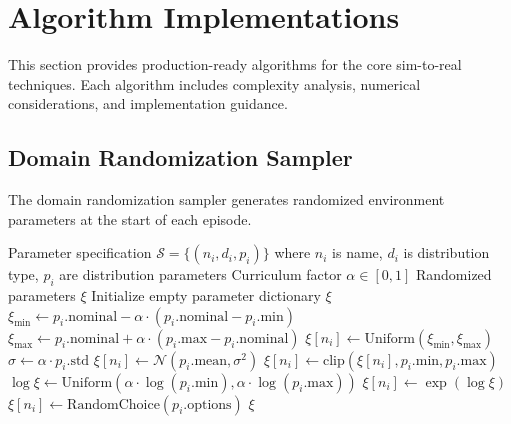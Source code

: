 \section{Algorithm Implementations}
\label{sec:algorithm_implementations_sim2real}

This section provides production-ready algorithms for the core sim-to-real techniques. Each algorithm includes complexity analysis, numerical considerations, and implementation guidance.

\subsection{Domain Randomization Sampler}

The domain randomization sampler generates randomized environment parameters at the start of each episode.

\begin{algorithm}[H]
\caption{Domain Randomization Parameter Sampler}
\label{alg:domain_randomization}
\begin{algorithmic}[1]
\REQUIRE Parameter specification $\mathcal{S} = \{(n_i, d_i, p_i)\}$ where $n_i$ is name, $d_i$ is distribution type, $p_i$ are distribution parameters
\REQUIRE Curriculum factor $\alpha \in [0, 1]$
\ENSURE Randomized parameters $\xi$
\STATE Initialize empty parameter dictionary $\xi$
        \STATE $\xi_{\min} \gets p_i.\text{nominal} - \alpha \cdot (p_i.\text{nominal} - p_i.\text{min})$
        \STATE $\xi_{\max} \gets p_i.\text{nominal} + \alpha \cdot (p_i.\text{max} - p_i.\text{nominal})$
        \STATE $\xi[n_i] \gets \text{Uniform}(\xi_{\min}, \xi_{\max})$
        \STATE $\sigma \gets \alpha \cdot p_i.\text{std}$
        \STATE $\xi[n_i] \gets \mathcal{N}(p_i.\text{mean}, \sigma^2)$
        \STATE $\xi[n_i] \gets \text{clip}(\xi[n_i], p_i.\text{min}, p_i.\text{max})$
        \STATE $\log\xi \gets \text{Uniform}(\alpha \cdot \log(p_i.\text{min}), \alpha \cdot \log(p_i.\text{max}))$
        \STATE $\xi[n_i] \gets \exp(\log\xi)$
        \STATE $\xi[n_i] \gets \text{RandomChoice}(p_i.\text{options})$
    \ENDIF
\ENDFOR
\RETURN $\xi$
\end{algorithmic}
\end{algorithm}

